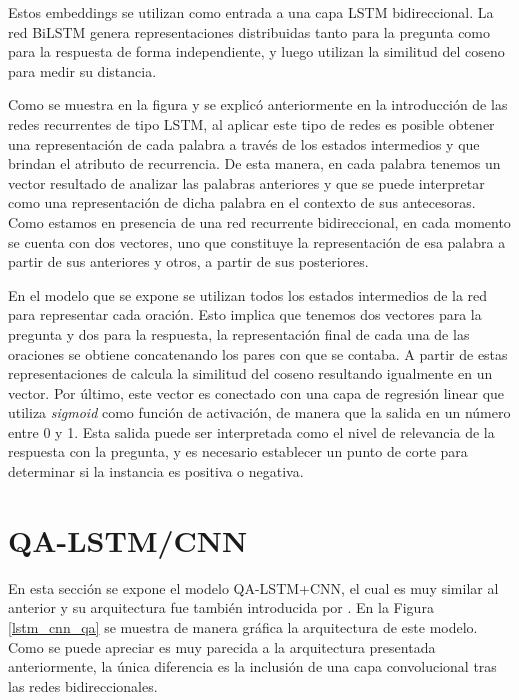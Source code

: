 Estos embeddings se utilizan como entrada a una capa LSTM bidireccional. La red BiLSTM genera representaciones distribuidas tanto para la pregunta como para la respuesta de forma independiente, y luego utilizan la similitud del coseno para medir su distancia. 

Como se muestra en la figura y se explicó anteriormente en la introducción de las redes recurrentes de tipo LSTM, al aplicar este tipo de redes es posible obtener una representación de cada palabra a través de los estados intermedios y que brindan el atributo de recurrencia. De esta manera, en cada palabra tenemos un vector resultado de analizar las palabras anteriores y que se puede interpretar como una representación de dicha palabra en el contexto de sus antecesoras. Como estamos en presencia de una red recurrente bidireccional, en cada momento se cuenta con dos vectores, uno que constituye la representación de esa palabra a partir de sus anteriores y otros, a partir de sus posteriores. 

En el modelo que se expone se utilizan todos los estados intermedios de la red para representar cada oración. Esto implica que tenemos dos vectores para la pregunta y dos para la respuesta, la representación final de cada una de las oraciones se obtiene concatenando los pares con que se contaba. A partir de estas representaciones de calcula la similitud del coseno resultando igualmente en un vector. Por último, este vector es conectado con una capa de regresión linear que utiliza \textit{sigmoid} como función de activación, de manera que la salida en un número entre 0 y 1. Esta salida puede ser interpretada como el nivel de relevancia de la respuesta con la pregunta, y es necesario establecer un punto de corte para determinar si la instancia es positiva o negativa.

\section{QA-LSTM/CNN}

En esta sección se expone el modelo QA-LSTM+CNN, el cual es muy similar al anterior y su arquitectura fue también introducida por \cite{2015-tan-qalstm}. En la Figura \ref{lstm_cnn_qa} se muestra de manera gráfica la arquitectura de este modelo. Como se puede apreciar es muy parecida a la arquitectura presentada anteriormente, la única diferencia es la inclusión de una capa convolucional tras las redes bidireccionales.


